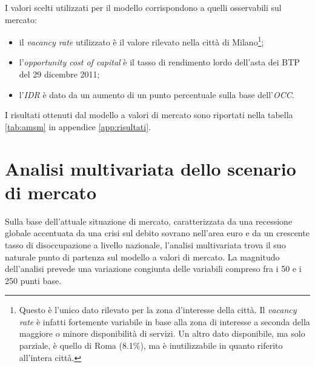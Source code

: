 I valori scelti utilizzati per il modello corrispondono a quelli osservabili sul mercato:
\begin{itemize}
\item il {\itshape vacancy rate} utilizzato è il valore rilevato nella città di Milano\footnote{Questo è l'unico dato rilevato per la zona d'interesse della città. Il {\itshape vacancy rate} è infatti fortemente variabile in base alla zona di interesse a seconda della maggiore o minore disponibilità di servizi. Un altro dato disponibile, ma solo parziale, è quello di Roma (8.1\%), ma è inutilizzabile in quanto riferito all'intera città.};
\item l'{\itshape opportunity cost of capital} è il tasso di rendimento lordo dell'asta dei BTP del 29 dicembre 2011\cite{btp};
\item l'\textit{IDR} è dato da un aumento di un punto percentuale sulla base dell'\textit{OCC}.
\end{itemize}
I risultati ottenuti dal modello a valori di mercato sono riportati nella tabella \ref{tab:amsm} in appendice \ref{app:risultati}.

\section{Analisi multivariata dello scenario di mercato}
Sulla base dell'attuale situazione di mercato, caratterizzata da una recessione globale accentuata da una crisi sul debito sovrano nell'area euro e da un crescente tasso di disoccupazione a livello nazionale\cite[p. 40]{bollettinoecobdi}, l'analisi multivariata trova il suo naturale punto di partenza sul modello a valori di mercato.
La magnitudo dell'analisi prevede una variazione congiunta delle variabili compreso fra i 50 e i 250 punti base.

\clearpage